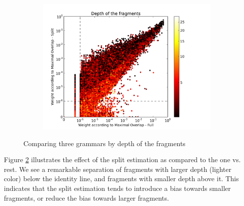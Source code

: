 \begin{figure}
\begin{subfigure}{0.32\textwidth}
\label{f:SDS-MOF}
\end{subfigure}
\begin{subfigure}{0.32\textwidth}
\includegraphics[width=\linewidth,trim=0.5cm 0cm 2.5cm 0.5cm, clip=true]{../data/plots/2.png}
\label{f:MOS-MOF}
\end{subfigure}

\caption{Comparing three grammars by depth of the fragments}
\label{f:depth3}
\end{figure}

Figure \ref{f:MOS-MOF} illustrates the effect of the split estimation as compared to the one vs. rest. We see a remarkable separation of fragments with larger depth (lighter color) below the identity line, and fragments with smaller depth above it. This indicates that the split estimation tends to introduce a bias towards smaller fragments, or reduce the bias towards larger fragments.





























